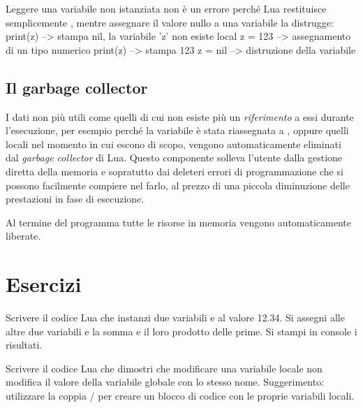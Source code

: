 Leggere una variabile non istanziata non è un errore perché Lua restituisce
semplicemente , mentre assegnare il valore nullo a una variabile la
distrugge:
\lines
print(z)      --> stampa nil, la variabile 'z' non esiste
local z = 123 --> assegnamento di un tipo numerico
print(z)      --> stampa 123
z = nil       --> distruzione della variabile
\endlines
{}


\subsection{Il garbage collector}

I dati non più utili come quelli di cui non esiste più un \emph{riferimento} a
essi durante l'esecuzione, per esempio perché la variabile è stata riassegnata a
, oppure quelli locali nel momento in cui escono di scopo, vengono
automaticamente eliminati dal \emph{garbage collector} di Lua. Questo componente
solleva l'utente dalla gestione diretta della memoria e sopratutto dai deleteri
errori di programmazione che si possono facilmente compiere nel farlo, al prezzo
di una piccola diminuzione delle prestazioni in fase di esecuzione.

Al termine del programma tutte le risorse in memoria vengono automaticamente
liberate.

\section{Esercizi}

\begin{Exercise}[label=fond-01]
Scrivere il codice Lua che instanzi due variabili  e  al valore
12.34. Si assegni alle altre due variabili  e  la somma e il
loro prodotto delle prime. Si stampi in console i risultati.
\end{Exercise}

\begin{Exercise}[label=fond-02]
Scrivere il codice Lua che dimostri che modificare una variabile locale non
modifica il valore della variabile globale con lo stesso nome. Suggerimento:
utilizzare la coppia / per creare un blocco di codice con le
proprie variabili locali.
\end{Exercise}

